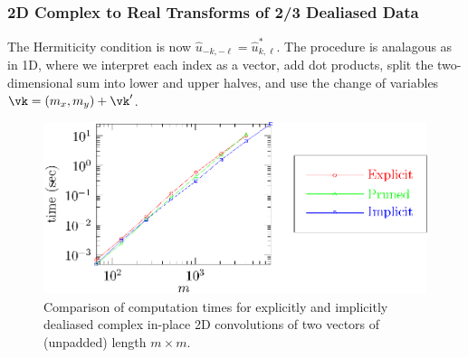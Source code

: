 \documentclass[final]{siamltex}
\def\ee{\end{dmath*}}
\def\bec{\begin{dmath*}[compact]}
\def\no{\hiderel}
\begin{document}
\subsubsection{2D Complex to Real Transforms of 2/3 Dealiased Data}
The Hermiticity condition is now $\hat{u}_{-k,-\ell}=\hat{u}^*_{k,\ell}$.
The procedure is analagous as in 1D,
where we interpret each index as a vector, add dot products,
split the two-dimensional sum into lower and upper halves, and use the
change of variables $\vk=(m_x,m_y)+\vk'$.

\begin{figure}[htbp]
  \begin{center}
    \includegraphics{timing2c}
    \caption{Comparison of computation times for explicitly and implicitly
dealiased complex in-place 2D convolutions of two vectors of
(unpadded) length $m\times m$.}
    \label{timing2c}
  \end{center}
\end{figure}
\end{document}
